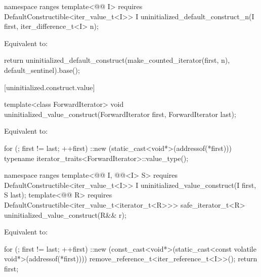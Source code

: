 \begin{addedblock}
%
\begin{itemdecl}
namespace ranges {
  template<@@ I>
      requires DefaultConstructible<iter_value_t<I>>
    I uninitialized_default_construct_n(I first, iter_difference_t<I> n);
}
\end{itemdecl}

\begin{itemdescr}
\pnum
\effects Equivalent to:
\begin{codeblock}
return uninitialized_default_construct(make_counted_iterator(first, n),
                                       default_sentinel{}).base();
\end{codeblock}
\end{itemdescr}
\end{addedblock}

[uninitialized.construct.value]{}

%
\begin{itemdecl}
template<class ForwardIterator>
  void uninitialized_value_construct(ForwardIterator first, ForwardIterator last);
\end{itemdecl}

\begin{itemdescr}
\pnum
\effects
Equivalent to:
\begin{codeblock}
for (; first != last; ++first)
  ::new (static_cast<void*>(addressof(*first)))
    typename iterator_traits<ForwardIterator>::value_type();
\end{codeblock}
\end{itemdescr}

\begin{addedblock}
%
\begin{itemdecl}
namespace ranges {
  template<@@ I, @@<I> S>
      requires DefaultConstructible<iter_value_t<I>>
    I uninitialized_value_construct(I first, S last);
  template<@@ R>
      requires DefaultConstructible<iter_value_t<iterator_t<R>>>
    safe_iterator_t<R> uninitialized_value_construct(R&& r);
}
\end{itemdecl}

\begin{itemdescr}
\pnum
\effects Equivalent to:
\begin{codeblock}
for (; first != last; ++first)
  ::new (const_cast<void*>(static_cast<const volatile void*>(addressof(*first))))
    remove_reference_t<iter_reference_t<I>>();
return first;
\end{codeblock}
\end{itemdescr}
\end{addedblock}

